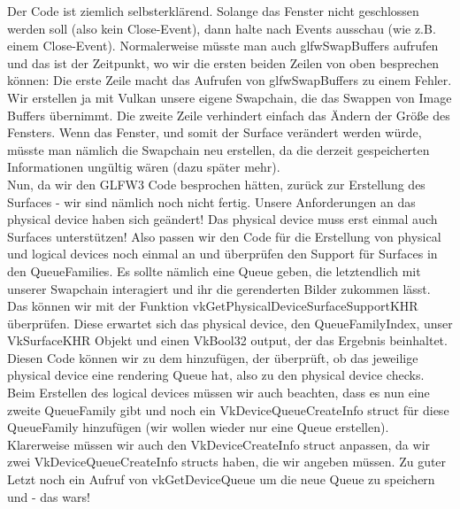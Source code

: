 \documentclass[11pt,a4paper]{report}
\begin{document}
Der Code ist ziemlich selbsterklärend. Solange das Fenster nicht geschlossen werden soll (also kein Close-Event), dann halte nach Events ausschau (wie z.B. einem Close-Event). Normalerweise müsste man auch glfwSwapBuffers aufrufen und das ist der Zeitpunkt, wo wir die ersten beiden Zeilen von oben besprechen können: Die erste Zeile macht das Aufrufen von glfwSwapBuffers zu einem Fehler. Wir erstellen ja mit Vulkan unsere eigene Swapchain, die das Swappen von Image Buffers übernimmt. Die zweite Zeile verhindert einfach das Ändern der Größe des Fensters. Wenn das Fenster, und somit der Surface verändert werden würde, müsste man nämlich die Swapchain neu erstellen, da die derzeit gespeicherten Informationen ungültig wären (dazu später mehr).\\
Nun, da wir den GLFW3 Code besprochen hätten, zurück zur Erstellung des Surfaces - wir sind nämlich noch nicht fertig. Unsere Anforderungen an das physical device haben sich geändert! Das physical device muss erst einmal auch Surfaces unterstützen! Also passen wir den Code für die Erstellung von physical und logical devices noch einmal an und überprüfen den Support für Surfaces in den QueueFamilies. Es sollte nämlich eine Queue geben, die letztendlich mit unserer Swapchain interagiert und ihr die gerenderten Bilder zukommen lässt. Das können wir mit der Funktion vkGetPhysicalDeviceSurfaceSupportKHR überprüfen. Diese erwartet sich das physical device, den QueueFamilyIndex, unser VkSurfaceKHR Objekt und einen VkBool32 output, der das Ergebnis beinhaltet.\\
Diesen Code können wir zu dem hinzufügen, der überprüft, ob das jeweilige physical device eine rendering Queue hat, also zu den physical device checks. Beim Erstellen des logical devices müssen wir auch beachten, dass es nun eine zweite QueueFamily gibt und noch ein VkDeviceQueueCreateInfo struct für diese QueueFamily hinzufügen (wir wollen wieder nur eine Queue erstellen). Klarerweise müssen wir auch den VkDeviceCreateInfo struct anpassen, da wir zwei VkDeviceQueueCreateInfo structs haben, die wir angeben müssen. Zu guter Letzt noch ein Aufruf von vkGetDeviceQueue um die neue Queue zu speichern und - das wars!

\newpage
\end{document}
